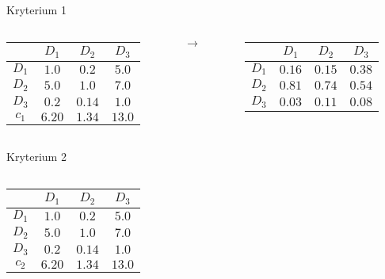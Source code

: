 \documentclass{beamer}
\begin{document}
\begin{frame}[allowframebreaks]
	Kryterium 1
	\begin{columns}
		\begin{column}{0.4\textwidth}
			\begin{table}
				\begin{tabular}{c|c|c|c}
					&	$D_1$	&	$D_2$	&	$D_3$\\ \hline
				$D_1$	&	$1.0$	&	$0.2$	&	$5.0$\\ \hline
				$D_2$	&	$5.0$	&	$1.0$	&	$7.0$\\ \hline
				$D_3$	&	$0.2$	&	$0.14$	&	$1.0$\\ \hline\hline
				$c_1$	&	$6.20$	&	$1.34$	&	$13.0$
				\end{tabular}
			\end{table}
		\end{column}
		\begin{column}{0.1\textwidth}
			$\rightarrow$
		\end{column}
		\begin{column}{0.4\textwidth}
			\begin{table}
				\begin{tabular}{c|c|c|c}
					&	$D_1$	&	$D_2$	&	$D_3$\\ \hline
				$D_1$	&	$0.16$	&	$0.15$	&	$0.38$\\ \hline
				$D_2$	&	$0.81$	&	$0.74$	&	$0.54$\\ \hline
				$D_3$	&	$0.03$	&	$0.11$	&	$0.08$
				\end{tabular}
			\end{table}
		\end{column}
	\end{columns}
	Kryterium 2
	\begin{columns}
		\begin{column}{0.4\textwidth}
			\begin{table}
				\begin{tabular}{c|c|c|c}
					&	$D_1$	&	$D_2$	&	$D_3$\\ \hline
				$D_1$	&	$1.0$	&	$0.2$	&	$5.0$\\ \hline
				$D_2$	&	$5.0$	&	$1.0$	&	$7.0$\\ \hline
				$D_3$	&	$0.2$	&	$0.14$	&	$1.0$\\ \hline\hline
				$c_2$	&	$6.20$	&	$1.34$	&	$13.0$
				\end{tabular}
			\end{table}
		\end{column}
		\begin{column}{0.1\textwidth}

\end{column}
\end{columns}
\end{frame}
\end{document}
